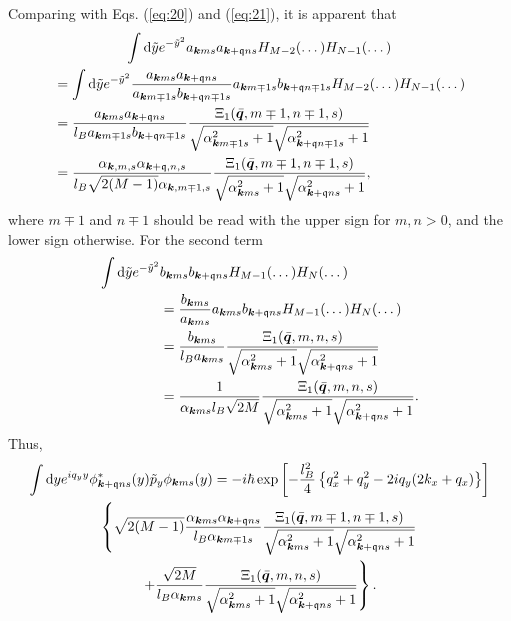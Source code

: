 Comparing with Eqs. (\ref{eq:20}) and (\ref{eq:21}), it is apparent that
\begin{multline}
  \int \mathrm{d}\tilde{y} e^{-\tilde{y}^2} a_{\vec{k}ms} a_{\vec{k}+\qvec{q} ns} H_{M-2}(\dots ) H_{N-1}(\dots )\\
  \begin{split}
  &= \int \mathrm{d}\tilde{y} e^{-\tilde{y}^2}
  \frac{a_{\vec{k}  m s} a_{\vec{k}+\qvec{q} n s}}{a_{\vec{k} m\mp1 s} b_{\vec{k}+\qvec{q} n\mp1 s}}
  a_{\vec{k} m\mp1 s} b_{\vec{k}+\qvec{q} n\mp1 s}
  H_{M-2}(\dots ) H_{N-1}(\dots )\\
  &=
  \frac{a_{\vec{k}  m s} a_{\vec{k}+\qvec{q} n s}}{l_{B} a_{\vec{k} m \mp 1 s} b_{\vec{k}+\qvec{q} n \mp 1 s}}
  \frac{\Xi _1(\bar{\vec{q}}, m\mp 1, n\mp 1, s) }{
    \sqrt{\alpha _{\vec{k} m\mp 1 s}^2 + 1} \sqrt{\alpha _{\vec{k}+\qvec{q} n\mp 1 s}^2 + 1}
  }\\
  &=
  \frac{\alpha_{\vec{k}, m, s} \alpha _{\vec{k}+\qvec{q}, n, s}}{l_{B} \sqrt{2(M-1)} \alpha _{\vec{k}, m\mp 1, s}}
  \frac{\Xi_1(\bar{\vec{q}}, m\mp 1, n\mp 1, s)}{
\sqrt{\alpha _{\vec{k} \vphantom{\qvec{q}} m s}^2 + 1} \sqrt{\alpha _{\vec{k}+\qvec{q} n s}^2 + 1}
  },
\end{split}
\end{multline}
where $m\mp 1$ and $n\mp 1$ should be read  with the upper sign for $m,n > 0$, and the lower sign otherwise.
For the second  term 
\begin{equation}
  \begin{split}
    \int \mathrm{d}\tilde{y} e^{-\tilde{y}^2} &b_{\vec{k}ms} b_{\vec{k}+\qvec{q} ns} H_{M-1}(\dots ) H_N(\dots )\\
    &= \frac{b_{\vec{k} m s}}{a_{\vec{k} m s}} a_{\vec{k} m s} b_{\vec{k}+\qvec{q} ns} H_{M-1}(\dots ) H_N(\dots )\\
    &= \frac{b_{\vec{k} m s}}{l_B a_{\vec{k} m s}}
    \frac{\Xi_1(\bar{\vec{q}}, m, n, s)}{\sqrt{\alpha _{\vec{k} \vphantom{\qvec{q}} m s}^2 + 1} \sqrt{\alpha _{\vec{k}+\qvec{q} n s}^2 + 1} }\\
    &= \frac{1}{\alpha _{\vec{k} m s} l_{B} \sqrt{2M}}
    \frac{\Xi_1(\bar{\vec{q}}, m, n, s)}{
      \sqrt{\alpha _{\vec{k} \vphantom{\qvec{q}} m s}^2 + 1}
      \sqrt{\alpha _{\vec{k}+\qvec{q} n s}^2 + 1}
    }.
  \end{split}
\end{equation}
Thus,
\begin{multline}
  \int \mathrm{d}y e^{iq_y y} \phi ^{*}_{\vec{k}+\qvec{q} ns}(y) \tilde{p}_y \phi _{\vec{k} ms}(y) =
  -i\hbar 
  \exp \left[ -\frac{l_B^2}{4} \left\{ q_x^2 + q_y^2 - 2iq_y ( 2k_x + q_x) \right\} \right]\\
  \left\{
    \sqrt{2(M-1)}
    \frac{\alpha _{\vec{k} m s} \alpha _{\vec{k} + \qvec{q} n s}}{l_B \alpha _{\vec{k} m\mp 1 s}}
    \frac{\Xi_1(\bar{\vec{q}}, m\mp 1, n \mp 1, s)}{
      \sqrt{\alpha _{\vec{k} \vphantom{\qvec{q}} m s}^2 + 1} \sqrt{\alpha _{\vec{k}+\qvec{q} n s}^2 + 1}
    }\right.\\
  \left.+
\frac{\sqrt{2M}}{l_B \alpha _{\vec{k} m s} }
  \frac{\Xi_1(\bar{\vec{q}}, m, n, s)}{\sqrt{\alpha _{\vec{k} \vphantom{\qvec{q}} m s}^2 + 1} \sqrt{\alpha _{\vec{k}+\qvec{q} n s}^2 + 1} }
  \right\}.
\end{multline}
